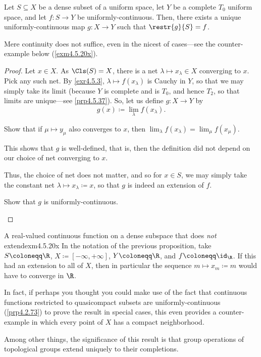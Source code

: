 \begin{prp}{}{}
Let $S\subseteq X$ be a dense subset of a uniform space, let $Y$ be a complete $T_0$ uniform space, and let $f\colon S\rightarrow Y$ be uniformly-continuous.  Then, there exists a unique uniformly-continuous map $g\colon X\rightarrow Y$ such that $\restr{g}{S}=f$.
\begin{rmk}
Mere continuity does not suffice, even in the nicest of cases---see the counter-example below (\cref{exm4.5.20x}).
\end{rmk}
\begin{proof}
Let $x\in X$.  As $\Cls (S)=X$, there is a net $\lambda \mapsto x_\lambda \in X$ converging to $x$.  Pick any such net.  By \cref{exr4.5.3},  $\lambda \mapsto f(x_\lambda )$ is Cauchy in $Y$, so that we may simply take its limit (because $Y$ is complete and is $T_0$, and hence $T_2$, so that limits are unique---see \cref{prp4.5.37}).  So, let us define $g\colon X\rightarrow Y$ by
\begin{equation}
g(x)\coloneqq \lim _\lambda f(x_\lambda ).
\end{equation}
\begin{exr}[breakable=false]{}{}
Show that if $\mu \mapsto y_\mu$ also converges to $x$, then $\lim _\lambda f(x_\lambda )=\lim _\mu f(x_\mu )$.
\begin{rmk}
This shows that $g$ is well-defined, that is, then the definition did not depend on our choice of net converging to $x$.
\end{rmk}
\end{exr}
Thus, the choice of net does not matter, and so for $x\in S$, we may simply take the constant net $\lambda \mapsto x_\lambda \coloneqq x$, so that $g$ is indeed an extension of $f$.
\begin{exr}[breakable=false]{}{}
Show that $g$ is uniformly-continuous.
\end{exr}
\end{proof}
\end{prp}
\begin{exm}{A real-valued continuous function on a dense subspace that does \emph{not} extend}{exm4.5.20x}
In the notation of the previous proposition, take $S\coloneqq \R$, $X\coloneqq [-\infty ,+\infty]$, $Y\coloneqq \R$, and $f\coloneqq \id _{\R}$.  If this had an extension to all of $X$, then in particular the sequence $m\mapsto x_m\coloneqq m$ would have to converge in $\R$.
\begin{rmk}
In fact, if perhaps you thought you could make use of the fact that continuous functions restricted to quasicompact subsets are uniformly-continuous (\cref{prp4.2.73}) to prove the result in special cases, this even provides a counter-example in which every point of $X$ has a compact neighborhood.
\end{rmk}
\end{exm}
Among other things, the significance of this result is that group operations of topological groups extend uniquely to their completions.

